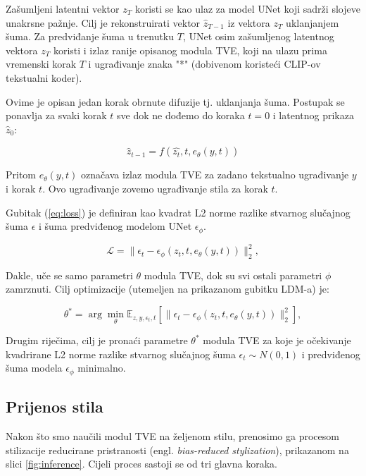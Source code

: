 Zašumljeni latentni vektor $z_T$ koristi se kao ulaz za model UNet koji sadrži slojeve unakrsne pažnje. Cilj je rekonstruirati vektor $\hat{z}_{T-1}$ iz vektora $z_T$ uklanjanjem šuma. Za predviđanje šuma u trenutku $T$, UNet osim zašumljenog latentnog vektora $z_T$ koristi i izlaz ranije opisanog modula TVE, koji na ulazu prima vremenski korak $T$ i ugrađivanje znaka "*" (dobivenom koristeći CLIP-ov tekstualni koder). 
  
Ovime je opisan jedan korak obrnute difuzije tj. uklanjanja šuma. Postupak se ponavlja za svaki korak $t$ sve dok ne dođemo do koraka $t = 0$ i latentnog prikaza $\hat{z}_0$:

\begin{equation}
    \hat{z}_{t-1} = f(\hat{z_t}, t, e_\theta(y, t))
\end{equation}

Pritom $e_\theta(y, t)$ označava izlaz modula TVE za zadano tekstualno ugrađivanje $y$ i korak $t$. Ovo ugrađivanje zovemo ugrađivanje stila za korak $t$.

Gubitak (\ref{eq:loss}) je definiran kao kvadrat L2 norme razlike stvarnog slučajnog šuma $\epsilon$ i šuma predviđenog modelom UNet $\epsilon_\phi$. 

\begin{equation}
    \mathcal{L} = \| \epsilon_t - \epsilon_\phi(z_t, t, e_\theta(y, t)) \|_2^2 ,
    \label{eq:loss}
\end{equation}

Dakle, uče se samo parametri $\theta$ modula TVE, dok su svi ostali parametri $\phi$ zamrznuti. Cilj optimizacije (utemeljen na prikazanom gubitku LDM-a) je:

\begin{equation}
    \theta^{*} = \arg\min_{\theta} \mathbb{E}_{z, y, \epsilon_t, t} \left[ \| \epsilon_t - \epsilon_\phi(z_t, t, e_\theta(y, t)) \|_2^2 \right],
\end{equation}

Drugim riječima, cilj je pronaći parametre $\theta^{*}$ modula TVE za koje je očekivanje kvadrirane L2 norme razlike stvarnog slučajnog šuma $\epsilon_t \sim N(0, 1)$ i predviđenog šuma modela $\epsilon_{\phi}$ minimalno.


\subsection{Prijenos stila}
Nakon što smo naučili modul TVE na željenom stilu, prenosimo ga procesom stilizacije reducirane pristranosti (engl. \textit{bias-reduced stylization}), prikazanom na slici \ref{fig:inference}. Cijeli proces sastoji se od tri glavna koraka.

